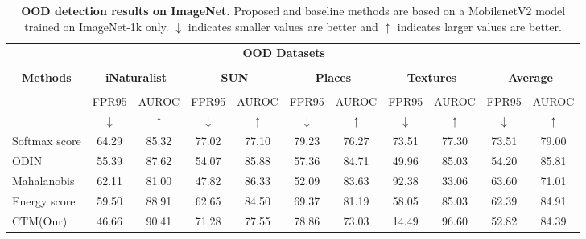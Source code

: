 \documentclass[nohyperref]{article}
\theoremstyle{plain}
\theoremstyle{definition}
\theoremstyle{remark}
\newcommand{\shortname}{CTM}
\begin{document}
\begin{table}[hbt!]
\caption{\textbf{OOD detection results on ImageNet.} Proposed and baseline methods are based on a MobilenetV2 model trained on ImageNet-1k \cite{deng2009imagenet} only. $\downarrow$ indicates smaller values are better and  $\uparrow$ indicates larger values are better.}
\label{tab:imagenet_mobilenetv2}
\resizebox{\textwidth}{!}
{
    \begin{tabular}{c c c c c c c c c c c}
    \hline
     & \multicolumn{8}{c}{\textbf{OOD Datasets}} & & \\
    \cline{2-9} \\
    \textbf{Methods} & \multicolumn{2}{c}{\textbf{iNaturalist}} & \multicolumn{2}{c}{\textbf{SUN}} & \multicolumn{2}{c}{\textbf{Places}} & \multicolumn{2}{c}{\textbf{Textures}} & \multicolumn{2}{c}{\textbf{Average}} \\
    & & & & & & & & & & \\
    & FPR95 & AUROC & FPR95 & AUROC & FPR95 & AUROC & FPR95 & AUROC & FPR95 & AUROC \\
    & $\downarrow$ & $\uparrow$ & $\downarrow$ & $\uparrow$ & $\downarrow$ & $\uparrow$ & $\downarrow$ & $\uparrow$ & $\downarrow$ & $\uparrow$ \\
    \midrule
    \multicolumn{1}{l}{Softmax score} & 64.29 & 85.32 & 77.02 & 77.10 & 79.23 & 76.27 & 73.51 & 77.30 & 73.51 & 79.00 \\
    \multicolumn{1}{l}{ODIN} & 55.39 & 87.62 & 54.07 & 85.88 & 57.36 & 84.71 & 49.96 & 85.03 & 54.20 & 85.81 \\
    \multicolumn{1}{l}{Mahalanobis} & 62.11 & 81.00 & 47.82 & 86.33 & 52.09 & 83.63 & 92.38 & 33.06 & 63.60 & 71.01 \\
    \multicolumn{1}{l}{Energy score} & 59.50 & 88.91 & 62.65 & 84.50 & 69.37 & 81.19 & 58.05 & 85.03 & 62.39 & 84.91 \\
    \midrule
    \multicolumn{1}{l}{\shortname\;(Our)}  & 46.66 & 90.41 & 71.28 & 77.55 & 78.86 & 73.03 & 14.49 & 96.60 & 52.82 & 84.39 \\
    \bottomrule
    \end{tabular}
}
\vspace{0.1in}

\end{table}
\end{document}
